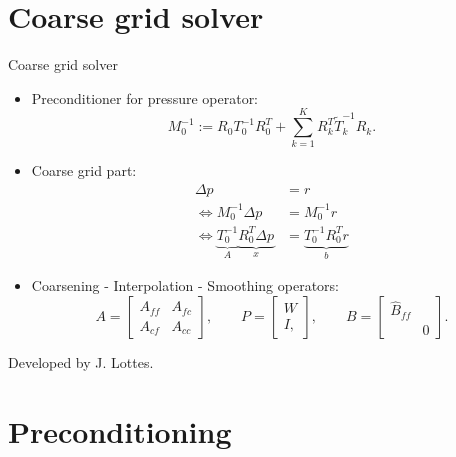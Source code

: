 \documentclass[usenames,dvipsnames,svgnames,9pt]{beamer}
\begin{document}
\section{Coarse grid solver}

\begin{frame}{Coarse grid solver}{}

\begin{itemize}
\item Preconditioner for pressure operator: 
\begin{equation*}
M_0^{-1} := R_0 T_0^{-1} R_0^T + \sum_{k=1}^{K} R_k^T \tilde{T}_k^{-1} R_k.
\end{equation*}

\item Coarse grid part:
\begin{align*}
\Delta p & = r \\
\Leftrightarrow M_0^{-1} \Delta p & = M_0^{-1}r \\
\Leftrightarrow \underbrace{T_0^{-1}}_{A} \underbrace{R_0^T \Delta p}_{x} & = \underbrace{T_0^{-1} R_0^T r}_{b}
\end{align*}

\item Coarsening - Interpolation - Smoothing operators:
\begin{equation*}
 A = 
 \begin{bmatrix}
  A_{ff} & A_{fc} \\
  A_{cf} & A_{cc}
 \end{bmatrix}, \qquad
 P = 
 \begin{bmatrix}
  W \\
  I,
 \end{bmatrix}, \qquad
 B = 
 \begin{bmatrix}
  \hat{B}_{ff} &  \\
   & 0
 \end{bmatrix}.
\end{equation*}
\end{itemize}

Developed by J. Lottes.

\end{frame}

\section{Preconditioning}
\end{document}
